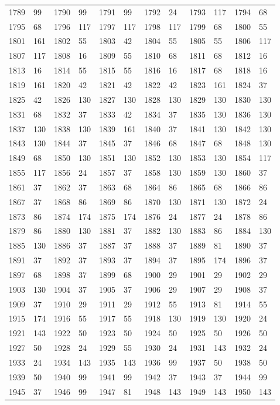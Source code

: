 \begin{longtable}{llllllllllll}
1789 & 99&1790 &99&1791& 99&1792 &24&1793 &117&1794& 68\\
1795 & 68&1796 &117&1797& 117&1798 &117&1799 &68&1800& 55\\
1801 & 161&1802 &55&1803& 42&1804 &55&1805 &55&1806& 117\\
1807 & 117&1808 &16&1809& 55&1810 &68&1811 &68&1812& 16\\
1813 & 16&1814 &55&1815& 55&1816 &16&1817 &68&1818& 16\\
1819 & 161&1820 &42&1821& 42&1822 &42&1823 &161&1824& 37\\
1825 & 42&1826 &130&1827& 130&1828 &130&1829 &130&1830& 130\\
1831 & 68&1832 &37&1833& 42&1834 &37&1835 &130&1836& 130\\
1837 & 130&1838 &130&1839& 161&1840 &37&1841 &130&1842& 130\\
1843 & 130&1844 &37&1845& 37&1846 &68&1847 &68&1848& 130\\
1849 & 68&1850 &130&1851& 130&1852 &130&1853 &130&1854& 117\\
1855 & 117&1856 &24&1857& 37&1858 &130&1859 &130&1860& 37\\
1861 & 37&1862 &37&1863& 68&1864 &86&1865 &68&1866& 86\\
1867 & 37&1868 &86&1869& 86&1870 &130&1871 &130&1872& 24\\
1873 & 86&1874 &174&1875& 174&1876 &24&1877 &24&1878& 86\\
1879 & 86&1880 &130&1881& 37&1882 &130&1883 &86&1884& 130\\
1885 & 130&1886 &37&1887& 37&1888 &37&1889 &81&1890& 37\\
1891 & 37&1892 &37&1893& 37&1894 &37&1895 &174&1896& 37\\
1897 & 68&1898 &37&1899& 68&1900 &29&1901 &29&1902& 29\\
1903 & 130&1904 &37&1905& 37&1906 &29&1907 &29&1908& 37\\
1909 & 37&1910 &29&1911& 29&1912 &55&1913 &81&1914& 55\\
1915 & 174&1916 &55&1917& 55&1918 &130&1919 &130&1920& 24\\
1921 & 143&1922 &50&1923& 50&1924 &50&1925 &50&1926& 50\\
1927 & 50&1928 &24&1929& 55&1930 &24&1931 &143&1932& 24\\
1933 & 24&1934 &143&1935& 143&1936 &99&1937 &50&1938& 50\\
1939 & 50&1940 &99&1941& 99&1942 &37&1943 &37&1944& 99\\
1945 & 37&1946 &99&1947& 81&1948 &143&1949 &143&1950& 143\\

\end{longtable}
